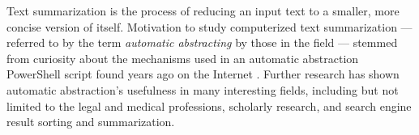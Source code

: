 Text summarization is the process of reducing an input text to a smaller, more concise version of itself. Motivation to study computerized text summarization --- referred to by the term {\em automatic abstracting}  by those in the field --- stemmed from curiosity about the mechanisms used in an automatic abstraction PowerShell script found years ago on the Internet \cite{PSScript}. Further research has shown automatic abstraction's usefulness in many interesting fields, including but not limited to the legal and medical professions, scholarly research, and search engine result sorting and summarization.